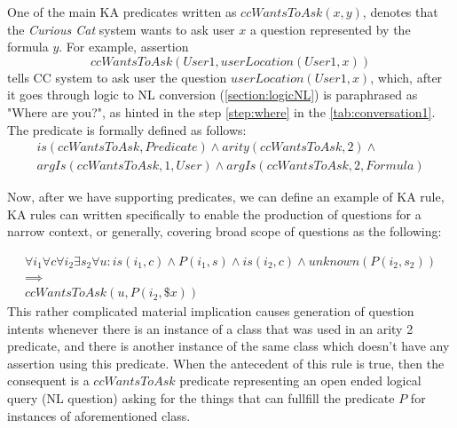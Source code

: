 \begin{definition}\label{def:pred_ccWantsToAsk}
One of the main KA predicates written as $ccWantsToAsk(x,y)$, denotes that the 
\emph{Curious Cat} system wants to ask user $x$ a question represented by the
formula $y$. For example, assertion 
\begin{equation*}
ccWantsToAsk(User1, userLocation(User1,x))
\end{equation*}
tells CC system to ask user the question $userLocation(User1,x)$, which,
after it goes through logic to NL conversion (\autoref{section:logicNL}) is 
paraphrased as
"Where are you?", as hinted in the step \ref{step:where} in the 
\autoref{tab:conversation1}. The predicate is formally defined as follows:
\begin{equation}\label{as:ccWantsToAsk}
\begin{gathered}
	is(ccWantsToAsk,Predicate) \land arity(ccWantsToAsk,2) \land\\ 
	argIs(ccWantsToAsk,1,User) \land argIs(ccWantsToAsk,2,Formula)
\end{gathered}
\end{equation}
\end{definition}

Now, after we have supporting predicates, we can define an example of KA rule, 
KA rules can written specifically to enable the production of questions for a 
narrow context, or generally, covering broad scope of questions as the
following:

\begin{equation}\label{as:generalRule}
\begin{gathered}
\forall i_1 \forall c \forall i_2 \exists s_2 \forall u:is(i_1,c) \land P(i_1,s) \land is(i_2,c)\land unknown(P(i_2,s_2)) \\ 
	\implies \\
ccWantsToAsk(u,P(i_2,\$x))
\end{gathered}
\end{equation}
This rather complicated material implication causes generation of question 
intents whenever there is an instance of a class that was used in an arity 2 
predicate, and there is another instance of the same class which doesn’t have 
any assertion using this predicate. When the antecedent of this rule is true,
then the consequent is a $ccWantsToAsk$ predicate representing an open
ended logical query (NL question) asking for the things that can fullfill the
predicate $P$ for instances of aforementioned class.

